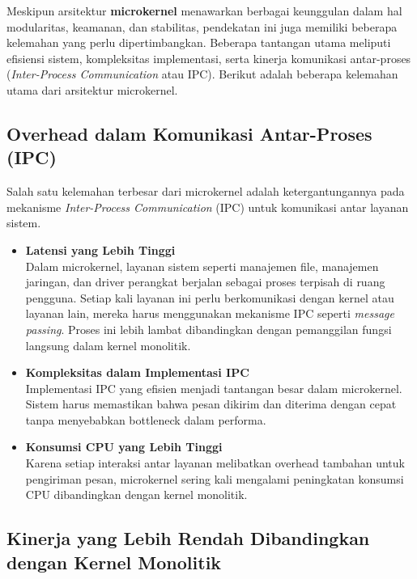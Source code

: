 Meskipun arsitektur \textbf{microkernel} menawarkan berbagai keunggulan dalam hal modularitas, keamanan, dan stabilitas, pendekatan ini juga memiliki beberapa kelemahan yang perlu dipertimbangkan. Beberapa tantangan utama meliputi efisiensi sistem, kompleksitas implementasi, serta kinerja komunikasi antar-proses (\textit{Inter-Process Communication} atau IPC). Berikut adalah beberapa kelemahan utama dari arsitektur microkernel.

\subsection{Overhead dalam Komunikasi Antar-Proses (IPC)}

Salah satu kelemahan terbesar dari microkernel adalah ketergantungannya pada mekanisme \textit{Inter-Process Communication} (IPC) untuk komunikasi antar layanan sistem.

\begin{itemize}
	\item \textbf{Latensi yang Lebih Tinggi} \\
	Dalam microkernel, layanan sistem seperti manajemen file, manajemen jaringan, dan driver perangkat berjalan sebagai proses terpisah di ruang pengguna. Setiap kali layanan ini perlu berkomunikasi dengan kernel atau layanan lain, mereka harus menggunakan mekanisme IPC seperti \textit{message passing}. Proses ini lebih lambat dibandingkan dengan pemanggilan fungsi langsung dalam kernel monolitik.
	
	\item \textbf{Kompleksitas dalam Implementasi IPC} \\
	Implementasi IPC yang efisien menjadi tantangan besar dalam microkernel. Sistem harus memastikan bahwa pesan dikirim dan diterima dengan cepat tanpa menyebabkan bottleneck dalam performa.
	
	\item \textbf{Konsumsi CPU yang Lebih Tinggi} \\
	Karena setiap interaksi antar layanan melibatkan overhead tambahan untuk pengiriman pesan, microkernel sering kali mengalami peningkatan konsumsi CPU dibandingkan dengan kernel monolitik.
\end{itemize}

\subsection{Kinerja yang Lebih Rendah Dibandingkan dengan Kernel Monolitik}


